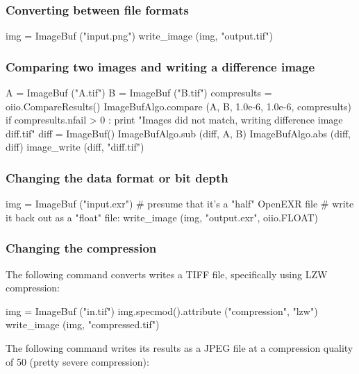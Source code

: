 \subsubsection*{Converting between file formats}

\begin{code}
    img = ImageBuf ("input.png")
    write_image (img, "output.tif")
\end{code}


\subsubsection*{Comparing two images and writing a difference image}

\begin{code}
    A = ImageBuf ("A.tif")
    B = ImageBuf ("B.tif")
    compresults = oiio.CompareResults()
    ImageBufAlgo.compare (A, B, 1.0e-6, 1.0e-6, compresults)
    if compresults.nfail > 0 :
        print "Images did not match, writing difference image diff.tif"
        diff = ImageBuf()
        ImageBufAlgo.sub (diff, A, B)
        ImageBufAlgo.abs (diff, diff)
        image_write (diff, "diff.tif")
\end{code}


\subsubsection*{Changing the data format or bit depth}

\begin{code}
    img = ImageBuf ("input.exr")
    # presume that it's a "half" OpenEXR file
    # write it back out as a "float" file:
    write_image (img, "output.exr", oiio.FLOAT)
\end{code}


\subsubsection*{Changing the compression}

The following command converts writes a TIFF file, specifically using
LZW compression:

\begin{code}
    img = ImageBuf ("in.tif")
    img.specmod().attribute ("compression", "lzw")
    write_image (img, "compressed.tif")
\end{code}

The following command writes its results as a JPEG file at a 
compression quality of 50 (pretty severe compression):

